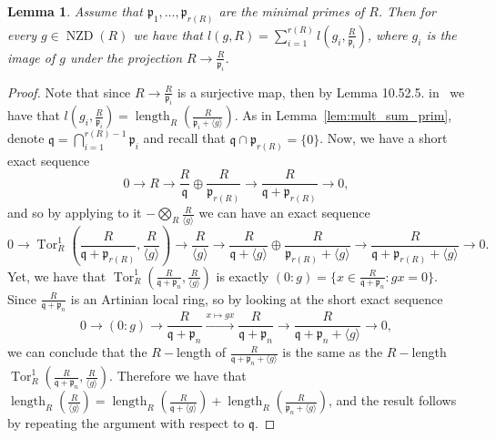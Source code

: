 \documentclass{article}
\newtheorem{lemma}[theorem]{Lemma}
\DeclareMathOperator{\length}{length}
\DeclareMathOperator{\NZD}{NZD}
\DeclareMathOperator{\Tor}{Tor}
\numberwithin{theorem}{section}
\begin{document}
\begin{lemma}\label{lem:l_irred}
     Assume that $\mathfrak{p}_1, \dots, \mathfrak{p}_{r(R)}$ are the minimal primes of $R$. Then for every $g \in \NZD(R)$ we have that $l(g,R)=\sum_{i=1}^{r(R)} l(g_i, \frac{R}{\mathfrak{p}_i})$, where $g_i$ is the image of $g$ under the projection $R \to \frac{R}{\mathfrak{p}_i}$.
\end{lemma}

\begin{proof}
    Note that since $R \to \frac{R}{\mathfrak{p}_i}$ is a surjective map, then by Lemma 10.52.5. in~\cite{stacks-project} we have that $l(g_i, \frac{R}{\mathfrak{p}_i}) = \length_R \left(\frac{R}{\mathfrak{p}_i + \langle g \rangle}\right)$. As in Lemma~\ref{lem:mult_sum_prim}, denote $\mathfrak{q}=\bigcap_{i=1}^{r(R)-1} \mathfrak{p}_i$ and recall that $\mathfrak{q}\cap \mathfrak{p}_{r(R)} = \{0\}$. Now, we have a short exact sequence 
    \begin{equation*}
        0 \to R \to \frac{R}{\mathfrak{q}} \oplus \frac{R}{\mathfrak{p}_{r(R)} } \to \frac{R}{\mathfrak{q}+\mathfrak{p}_{r(R)} } \to 0,
    \end{equation*}
     \noindent and so by applying to it $-\bigotimes_R \frac{R}{\langle g \rangle}$ we can have an exact sequence 
    \begin{equation*}
         0 \to  \Tor^1_R\left( \frac{R}{\mathfrak{q}+\mathfrak{p}_{r(R)} }, \frac{R}{\langle g \rangle} \right) \to  \frac{R}{\langle g \rangle} \to \frac{R}{\mathfrak{q} + \langle g \rangle} \oplus \frac{R}{\mathfrak{p}_{r(R)} + \langle g \rangle} \to \frac{R}{\mathfrak{q}+\mathfrak{p}_{r(R)} + \langle g \rangle} \to 0. 
    \end{equation*}
    \noindent Yet, we have that $\Tor^1_R\left( \frac{R}{\mathfrak{q}+\mathfrak{p}_n}, \frac{R}{\langle g \rangle} \right)$ is exactly $( 0 \colon g) = \{ x \in \frac{R}{\mathfrak{q}+\mathfrak{p}_n} \colon gx =0\}$. Since $\frac{R}{\mathfrak{q}+\mathfrak{p}_n}$ is an Artinian local ring, so by looking at the short exact sequence
    \begin{equation*}
        0 \to (0 : g) \to \frac{R}{\mathfrak{q}+\mathfrak{p}_n} \xrightarrow{x \mapsto gx}  \frac{R}{\mathfrak{q}+\mathfrak{p}_n}  \to  \frac{R}{\mathfrak{q}+\mathfrak{p}_n+ \langle g \rangle} \to 0,
    \end{equation*}
    \noindent we can conclude that the $R-$length of $\frac{R}{\mathfrak{q}+\mathfrak{p}_n+ \langle g \rangle} $ is the same as the $R-$length $\Tor^1_R\left( \frac{R}{\mathfrak{q}+\mathfrak{p}_n}, \frac{R}{\langle g \rangle} \right)$. Therefore we have that $\length_R \left ( \frac{R}{\langle g \rangle} \right) = \length_R \left(\frac{R}{\mathfrak{q} + \langle g \rangle}\right) +  \length_R \left( \frac{R}{\mathfrak{p}_n+ \langle g \rangle}\right)$, and the result follows by repeating the argument with respect to $\mathfrak{q}$. 
\end{proof}
\end{document}
